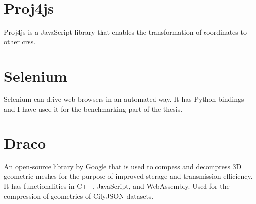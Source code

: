 \section{Proj4js}
\label{tools:proj4js}
Proj4js \citep{Proj4js2020} is a JavaScript library that enables the transformation of coordinates to other \ac{crs}s.

\section{Selenium}
\label{tools:selenium}
Selenium \citep{Muthukadan2020} can drive web browsers in an automated way.
It has Python bindings and I have used it for the benchmarking part of the thesis.

\section{Draco}
\label{tools:draco}
An open-source library by Google \citep{dracoperformance} that is used to compess and decompress 3D geometric meshes for the purpose of improved storage and transmission efficiency.
It has functionalities in C++, JavaScript, and WebAssembly.
Used for the compression of geometries of CityJSON datasets.